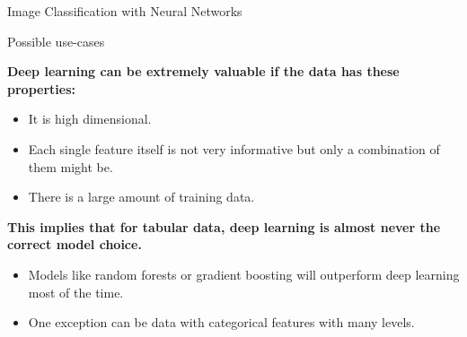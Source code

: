 \begin{frame}{Image Classification with Neural Networks}
\begin{overlayarea}{\textwidth}{\textheight}
\end{overlayarea}


\end{frame}


\begin{frame} {Possible use-cases}


\textbf{Deep learning can be extremely valuable if the data has these properties:}
\vspace{.2cm}
\begin{itemize}
\item It is high dimensional.
\item Each single feature itself is not very informative but only a combination of them might be.
\item There is a large amount of training data.
\end{itemize}

\vspace{.7cm}

\textbf{This implies that for tabular data, deep learning is almost never the correct model choice.}
\vspace{.2cm}
\begin{itemize}
\item Models like random forests or gradient boosting will outperform deep learning most of the time.
\item One exception can be data with categorical features with many levels.
\end{itemize}

\end{frame}



